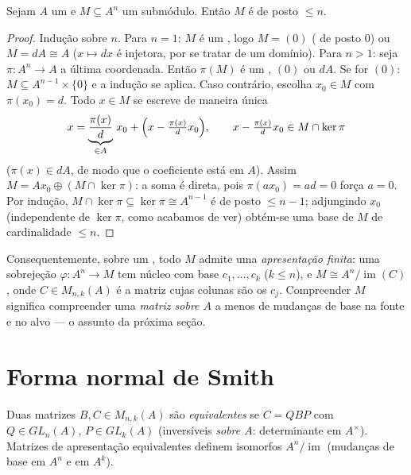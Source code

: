 \begin{theorem}\label{thm:b3:modules:submodule}
Sejam $A$ um  e $M \subseteq A^n$ um submódulo. Então $M$ é  de posto
$\leq n$.
\end{theorem}

\begin{proof}
Indução sobre $n$. Para $n = 1$: $M$ é um , logo $M = (0)$
( de posto $0$) ou $M = dA \cong A$ ($x \mapsto dx$ é injetora, por se tratar de um
domínio). Para $n > 1$: seja $\pi \colon A^n \to A$ a última coordenada. Então
$\pi(M)$ é um , $(0)$ ou $dA$. Se for $(0)$: $M \subseteq A^{n-1} \times \{0\}$ e a
indução se aplica. Caso contrário, escolha $x_0 \in M$ com $\pi(x_0) = d$. Todo $x \in M$ se
escreve de maneira única
\[
x = \underbrace{\frac{\pi(x)}{d}}_{\in A}\, x_0 +
\Bigl(x - \tfrac{\pi(x)}d x_0\Bigr),
\qquad x - \tfrac{\pi(x)}d x_0 \in M \cap \ker\pi
\]
($\pi(x) \in dA$, de modo que o coeficiente está em $A$). Assim $M = Ax_0
\oplus (M \cap \ker \pi)$: a soma é
direta, pois $\pi(ax_0) =
ad = 0$ força $a = 0$. Por indução, $M \cap \ker\pi \subseteq
\ker \pi \cong A^{n-1}$ é  de posto
$\leq n - 1$; adjungindo $x_0$ (independente de $\ker\pi$, como acabamos de
ver) obtém-se uma base de $M$ de cardinalidade $\leq n$.
\end{proof}

\begin{remark}\label{rem:b3:modules:presentation}
Consequentemente, sobre um , todo  $M$
admite uma \emph{apresentação finita}: uma sobrejeção $\varphi\colon A^n \to M$ tem núcleo
 com base $c_1, \dots, c_k$ ($k \leq n$), e $M
\cong A^n / \operatorname{im}(C)$, onde $C \in M_{n,k}(A)$ é a matriz cujas
colunas são os $c_j$. Compreender $M$ significa compreender uma
\emph{matriz sobre $A$} a menos de mudanças de base na fonte e no
alvo --- o assunto da próxima seção.
\end{remark}

\section{Forma normal de Smith}

\begin{definition}\label{def:b3:modules:equivalence}
Duas matrizes $B, C \in M_{n,k}(A)$ são \emph{equivalentes} se $C =
QBP$ com $Q \in GL_n(A)$, $P \in GL_k(A)$
(inversíveis \emph{sobre $A$}: determinante em $A^\times$). Matrizes de
apresentação equivalentes definem  isomorfos $A^n/
\operatorname{im}$ (mudanças de
base em $A^n$ e em $A^k$).
\end{definition}

